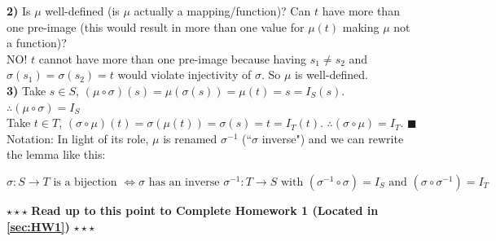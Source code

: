 \begin{lemma}
\noindent\textbf{2)} Is $\mu$ well-defined (is $\mu$ actually a mapping/function)? Can $t$ have more than one pre-image (this would result in more than one value for $\mu(t)$ making $\mu$ not a function)?\steezybreak\\
NO! $t$ cannot have more than one pre-image because having $s_1\neq s_2$ and $\sigma(s_1)=\sigma(s_2)=t$ would violate injectivity of $\sigma$. So $\mu$ is well-defined.\steezybreak\\

\noindent\textbf{3)} Take $s\in S$, $(\mu\circ \sigma)(s)=\mu(\sigma(s))=\mu(t)=s=I_S(s)$. $\therefore (\mu\circ \sigma)= I_S$\steezybreak\\

Take $t\in T$, $(\sigma\circ \mu)(t)= \sigma(\mu(t))=\sigma(s)=t=I_T(t)$. $\therefore (\sigma\circ \mu) = I_T$. $\blacksquare$ \steezybreak\\

\noindent Notation: In light of its role, $\mu$ is renamed $\sigma^{-1}$ (``$\sigma$ inverse") and we can rewrite the lemma like this:

\begin{equation}
    \sigma:S\rightarrow T \text{ is a bijection } \iff \sigma \text{ has an inverse } \sigma^{-1}: T\rightarrow S \text{ with } (\sigma^{-1}\circ \sigma)= I_S \text{ and } (\sigma \circ \sigma^{-1})=I_T\nonumber
\end{equation}
\end{lemma}\steezybreak
\begin{tcolorbox}
\begin{center}
    $\star\star\star$ \textbf{Read up to this point to Complete Homework 1 (Located in \ref{sec:HW1})} $\star\star\star$
\end{center}
\end{tcolorbox}
\steezybreak
